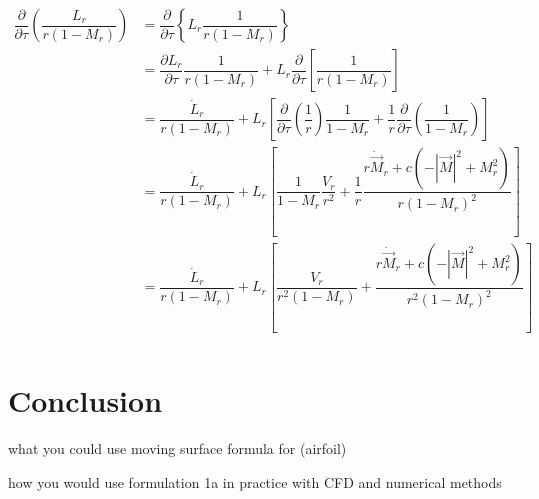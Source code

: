\documentclass[]{aiaa-tc}%
\begin{document}
\begin{align*}
\dfrac{\partial}{\partial \tau} \left( \dfrac{L_r}{r (1 - M_r)}  \right)
& = \dfrac{\partial}{\partial \tau} \left\{ L_r \dfrac{1}{r (1 - M_r)}  \right\} \\
& = \dfrac{\partial L_r}{\partial \tau} \dfrac{1}{r (1 - M_r)}
    + L_r\dfrac{\partial}{\partial \tau} \left[ \dfrac{1}{r (1 - M_r)} \right] \\
& = \dfrac{\dot{L}_r}{r (1 - M_r)}
    + L_r \left[
    \dfrac{\partial}{\partial\tau} \left(\dfrac{1}{r}\right) \dfrac{1}{1 - M_r}
    + \dfrac{1}{r} \dfrac{\partial}{\partial\tau} \left(\dfrac{1}{1-M_r}\right)
    \right] \\
& = \dfrac{\dot{L}_r}{r (1 - M_r)}
    + L_r \left[
    \dfrac{1}{1 - M_r} \dfrac{V_r}{r^2}
    + \dfrac{1}{r}
    \dfrac{ r\dot{\vec{M}}_r + c \left( -|\vec{M}|^2 + M_r^2 \right) }
    {r (1 - M_r)^2}
    \right] \\
& = \dfrac{\dot{L}_r}{r (1 - M_r)}
    + L_r \left[
    \dfrac{V_r}{r^2 (1 - M_r)}
    + \dfrac{ r\dot{\vec{M}}_r + c \left( -|\vec{M}|^2 + M_r^2 \right) }
        {r^2 (1 - M_r)^2}
    \right] \\
\end{align*}






\section*{Conclusion}

what you could use moving surface formula for (airfoil)

how you would use formulation 1a in practice with CFD and numerical methods
\end{document}
